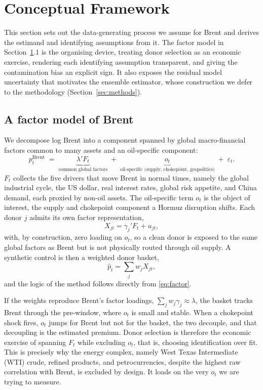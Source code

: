 \section{Conceptual Framework}\label{sec:theory}
This section sets out the data-generating process we assume for Brent and derives the
estimand and identifying assumptions from it. The factor model in
Section~\ref{sec:theory}.1 is the organising device, treating donor selection as an economic
exercise, rendering each identifying assumption transparent, and giving the contamination
bias an explicit sign. It also exposes the residual model uncertainty that motivates the
ensemble estimator, whose construction we defer to the methodology
(Section~\ref{sec:methods}).

\subsection{A factor model of Brent}
We decompose log Brent into a component spanned by global macro-financial factors common
to many assets and an oil-specific component:
\begin{equation}
p^{\text{Brent}}_t \;=\; \underbrace{\lambda' F_t}_{\text{common global factors}}
\;+\; \underbrace{o_t}_{\text{oil-specific (supply, chokepoint, geopolitics)}}
\;+\; \varepsilon_t .
\label{eq:factor}
\end{equation}
$F_t$ collects the five drivers that move Brent in normal times, namely the global
industrial cycle, the US dollar, real interest rates, global risk appetite, and China
demand, each proxied by non-oil assets. The oil-specific term $o_t$ is the object of
interest, the supply and chokepoint component a Hormuz disruption shifts. Each donor $j$
admits its own factor representation,
\begin{equation}
X_{jt}=\gamma_j'F_t+u_{jt},
\label{eq:donor}
\end{equation}
with, by construction, zero loading on $o_t$, so a clean donor is exposed to the same global
factors as Brent but is not physically routed through oil supply. A synthetic control is then
a weighted donor basket,
\begin{equation}
\hat p_t=\sum_j w_j X_{jt},
\label{eq:synth}
\end{equation}
and the logic of the method follows directly from \eqref{eq:factor}.

If the weights reproduce Brent's factor loadings,
$\sum_j w_j\gamma_j\approx\lambda$, the basket tracks Brent through the pre-window, where
$o_t$ is small and stable. When a chokepoint shock fires, $o_t$ jumps for Brent but not
for the basket, the two decouple, and that decoupling is the estimated premium.
Donor selection is therefore the economic exercise of spanning $F_t$ while excluding
$o_t$, that is, choosing identification over fit. This is precisely why the energy
complex, namely West Texas Intermediate (WTI) crude, refined products, and
petrocurrencies, despite the highest raw correlation with Brent, is excluded by design.
It loads on the very $o_t$ we are trying to measure.

